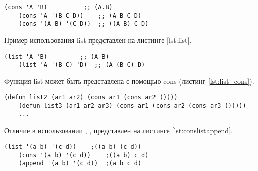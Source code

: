 \begin{lstlisting}[label=lst:cons, caption=Использование cons.]
	(cons 'A 'B)          ;; (A.B)
	(cons 'A '(B C D))    ;; (A B C D)
	(cons '(A B) '(C D))  ;; ((A B) C D) 
\end{lstlisting}

Пример использования list представлен на листинге \ref{lst:list}.
\begin{lstlisting}[label=lst:list, caption=Использование list.]
	(list 'A 'B)         ;; (A B)
	(list 'A '(B C) 'D)  ;; (A (B C) D)
\end{lstlisting}

\newpage
Функция list может быть представлена с помощью cons (листинг \ref{lst:list_cons}).

\begin{lstlisting}[label=lst:list_cons, caption=Представление list с помощью cons.]
	(defun list2 (ar1 ar2) (cons ar1 (cons ar2 ())))
	(defun list3 (ar1 ar2 ar3) (cons ar1 (cons ar2 (cons ar3 ()))))
	...
\end{lstlisting}

Отличие в использовании , ,  представлен на листинге \ref{lst:conslistappend}.
\begin{lstlisting}[label=lst:conslistappend, caption=Использование \text{cons,} \text{list,} \text{append}.]
	(list '(a b) '(c d)) 	;((a b) (c d))
	(cons '(a b) '(c d))    ;((a b) c d)
	(append '(a b) '(c d))  ;(a b c d)
\end{lstlisting}

